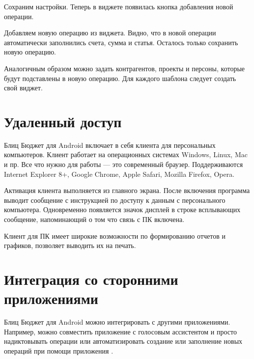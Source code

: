 \documentclass[a4paper,10pt,russian]{sphinxmanual}
\begin{document}
\sphinxAtStartPar
Сохраним настройки. Теперь в виджете появилась кнопка добавления новой операции.

\noindent{}

\sphinxAtStartPar
Добавляем новую операцию из виджета. Видно, что в новой операции автоматически заполнились счета, сумма и статья. Осталось
только сохранить новую операцию.

\sphinxAtStartPar
Аналогичным образом можно задать контрагентов, проекты и персоны, которые будут подставлены в новую операцию. Для каждого
шаблона следует создать свой виджет.

\sphinxstepscope


\chapter{Удаленный доступ}
\label{\detokenize{remote-access:chapter-remote-access}}\label{\detokenize{remote-access:id1}}\label{\detokenize{remote-access::doc}}
\sphinxAtStartPar
Блиц Бюджет для Android включает в себя клиента для персональных компьютеров. Клиент работает на операционных системах
Windows, Linux, Mac и пр. Все что нужно для работы — это современный браузер. Поддерживаются Internet
Explorer 8+, Google Chrome, Apple Safari, Mozilla Firefox, Opera.

\noindent{}
\noindent{}
\noindent{}

\sphinxAtStartPar
Активация клиента выполняется из главного экрана. После включения программа выводит сообщение с инструкцией
по доступу к данным с персонального компьютера. Одновременно появляется значок дисплей в строке всплывающих
сообщение, напоминающий о том что связь с ПК включена.

\sphinxAtStartPar
Клиент для ПК имеет широкие возможности по формированию отчетов и графиков, позволяет выводить их на печать.

\sphinxstepscope


\chapter{Интеграция со сторонними приложениями}
\label{\detokenize{api:chapter-api}}\label{\detokenize{api:id1}}\label{\detokenize{api::doc}}
\sphinxAtStartPar
Блиц Бюджет для Android можно интегрировать с другими приложениями. Например, можно совместить приложение с голосовым
ассистентом и просто надиктовывать операции или автоматизировать создание или заполнение новых операций при помощи
приложения .
\end{document}
